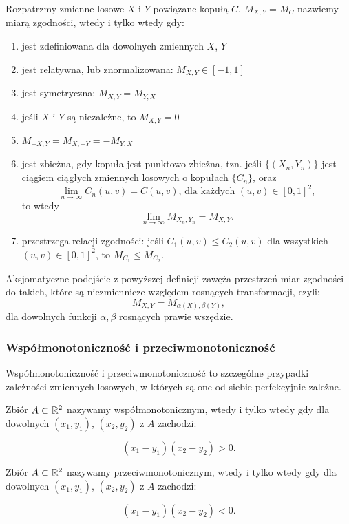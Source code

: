 \begin{df}
	Rozpatrzmy zmienne losowe $X$ i $Y$ powiązane kopułą $C$. $M_{X,Y}=M_C$ nazwiemy miarą zgodności, wtedy i tylko wtedy gdy:
	\begin{enumerate}
		\item jest zdefiniowana dla dowolnych zmiennych $X$, $Y$
		\item jest relatywna, lub znormalizowana: $M_{X,Y}\in[-1,1]$
		\item jest symetryczna: $M_{X,Y}=M_{Y,X}$
		\item jeśli $X$ i $Y$ są niezależne, to $M_{X,Y}=0$
		\item $M_{-X,Y}=M_{X,-Y}=-M_{Y,X}$
		\item jest zbieżna, gdy kopuła jest punktowo zbieżna, tzn. jeśli $\{(X_n,Y_n)\}$ jest ciągiem ciągłych zmiennych losowych o kopułach $\{C_n\}$, oraz 
		$$ \lim\limits_{n\to\infty} C_n(u, v) =C(u, v)\text{, dla każdych }(u, v)\in[0,1]^2,$$
		to wtedy
		$$ \lim\limits_{n\to\infty}M_{X_n,Y_n}=M_{X,Y}.$$
		\item przestrzega relacji zgodności: jeśli $C_1(u,v) \leqslant C_2(u,v)$ dla wszystkich $(u, v)\in[0,1]^2$, to $M_{C_1} \leqslant M_{C_2}.$
	\end{enumerate}
	\label{def:miara_zgodnosci}		
\end{df}

Aksjomatyczne podejście z powyższej definicji zawęża przestrzeń miar zgodności do takich, które są niezmiennicze względem rosnących transformacji, czyli:
$$ M_{X,Y} = M_{\alpha(X), \beta(Y)},$$
dla dowolnych funkcji $\alpha,\beta$ rosnących prawie wszędzie.\\

\subsubsection{Współmonotoniczność i przeciwmonotoniczność}
Współmonotoniczność i przeciwmonotoniczność to szczególne przypadki zależności zmiennych losowych, w których są one od siebie perfekcyjnie zależne.

\begin{df}
	Zbiór $A \subset \mathbb{R}^2$ nazywamy współmonotonicznym, wtedy i tylko wtedy gdy dla dowolnych $(x_1, y_1)$, $(x_2, y_2)$ z $A$ zachodzi:
	
	$$ (x_1 - y_1)(x_2 - y_2) >0.$$
\end{df}

\begin{df}
	Zbiór $A \subset \mathbb{R}^2$ nazywamy przeciwmonotonicznym, wtedy i tylko wtedy gdy dla dowolnych $(x_1, y_1)$, $(x_2, y_2)$ z $A$ zachodzi:
	
	$$ (x_1 - y_1)(x_2 - y_2) <0.$$
\end{df}


